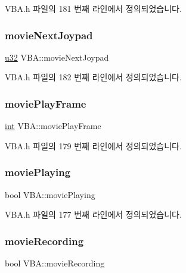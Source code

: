 V\+B\+A.\+h 파일의 181 번째 라인에서 정의되었습니다.

\mbox{\label{class_v_b_a_ae528fc1f675add097200192deecb4236}} 
\subsubsection{\texorpdfstring{movie\+Next\+Joypad}{movieNextJoypad}}
{\footnotesize\ttfamily \mbox{\hyperlink{_system_8h_a10e94b422ef0c20dcdec20d31a1f5049}{u32}} V\+B\+A\+::movie\+Next\+Joypad}



V\+B\+A.\+h 파일의 182 번째 라인에서 정의되었습니다.

\mbox{\label{class_v_b_a_afcffae74eebd4424790f8c48faede1c8}} 
\subsubsection{\texorpdfstring{movie\+Play\+Frame}{moviePlayFrame}}
{\footnotesize\ttfamily \mbox{\hyperlink{_util_8cpp_a0ef32aa8672df19503a49fab2d0c8071}{int}} V\+B\+A\+::movie\+Play\+Frame}



V\+B\+A.\+h 파일의 179 번째 라인에서 정의되었습니다.

\mbox{\label{class_v_b_a_ac490c27ebc24ea8fbccf42e2909d04ed}} 
\subsubsection{\texorpdfstring{movie\+Playing}{moviePlaying}}
{\footnotesize\ttfamily bool V\+B\+A\+::movie\+Playing}



V\+B\+A.\+h 파일의 177 번째 라인에서 정의되었습니다.

\mbox{\label{class_v_b_a_a7fbf39fb4604c00c8ad139b2e27f3756}} 
\subsubsection{\texorpdfstring{movie\+Recording}{movieRecording}}
{\footnotesize\ttfamily bool V\+B\+A\+::movie\+Recording}



